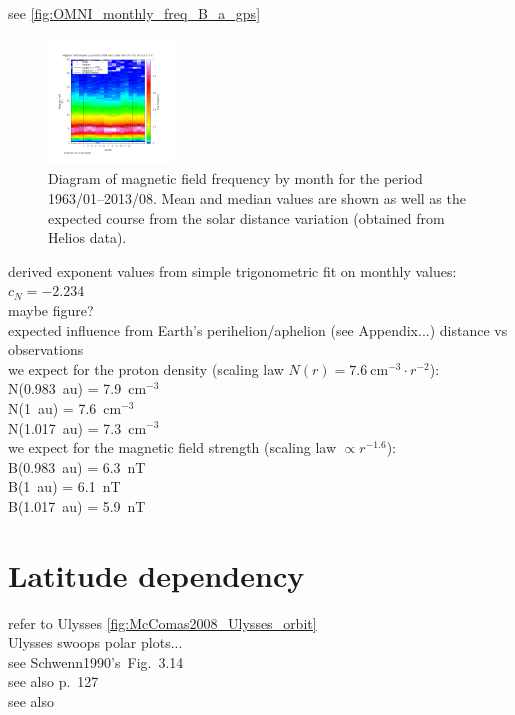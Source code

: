see \autoref{fig:OMNI_monthly_freq_B_a_gps}
\begin{figure}[htb]
	\centering
	\includegraphics[width=0.3\textwidth]{images/gnuplots/OMNI_monthly_freq_B_a_gps.png}
	\caption{Diagram of magnetic field frequency by month for the period 1963/01--2013/08. Mean and median values are shown as well as the expected course from the solar distance variation (obtained from Helios data).}
	\label{fig:OMNI_monthly_freq_B_a_gps}
\end{figure}

derived exponent values from simple trigonometric fit on monthly values:\\
$c_N = -2.234$\\
maybe figure?\\

expected influence from Earth's perihelion/aphelion (see Appendix...) distance vs observations\\
we expect for the proton density (scaling law $N(r) = 7.6~\text{cm}^{-3} \cdot r^{-2}$):\\
N(0.983~au) = 7.9~cm$^{-3}$\\
N(1~au) = 7.6~cm$^{-3}$\\
N(1.017~au) = 7.3~cm$^{-3}$\\
we expect for the magnetic field strength (scaling law $\propto r^{-1.6}$):\\
B(0.983~au) = 6.3~nT\\
B(1~au) = 6.1~nT\\
B(1.017~au) = 5.9~nT\\


\section{Latitude dependency}
refer to Ulysses \autoref{fig:McComas2008_Ulysses_orbit}\\
Ulysses swoops polar plots...\\

see Schwenn1990's~Fig.~3.14\\
see also \citet{Schwenn1990} p.~127\\
see also \citet{Richardson1995}\\

